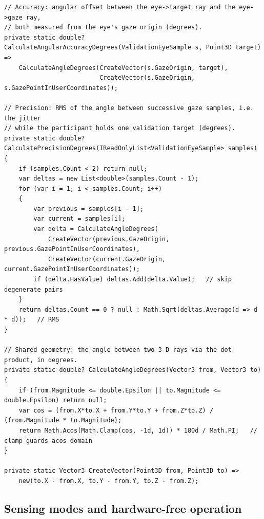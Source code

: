 \begin{listing}[htbp]
\begin{verbatim}
// Accuracy: angular offset between the eye->target ray and the eye->gaze ray,
// both measured from the eye's gaze origin (degrees).
private static double? CalculateAngularAccuracyDegrees(ValidationEyeSample s, Point3D target) =>
    CalculateAngleDegrees(CreateVector(s.GazeOrigin, target),
                          CreateVector(s.GazeOrigin, s.GazePointInUserCoordinates));

// Precision: RMS of the angle between successive gaze samples, i.e. the jitter
// while the participant holds one validation target (degrees).
private static double? CalculatePrecisionDegrees(IReadOnlyList<ValidationEyeSample> samples)
{
    if (samples.Count < 2) return null;
    var deltas = new List<double>(samples.Count - 1);
    for (var i = 1; i < samples.Count; i++)
    {
        var previous = samples[i - 1];
        var current = samples[i];
        var delta = CalculateAngleDegrees(
            CreateVector(previous.GazeOrigin, previous.GazePointInUserCoordinates),
            CreateVector(current.GazeOrigin, current.GazePointInUserCoordinates));
        if (delta.HasValue) deltas.Add(delta.Value);   // skip degenerate pairs
    }
    return deltas.Count == 0 ? null : Math.Sqrt(deltas.Average(d => d * d));   // RMS
}

// Shared geometry: the angle between two 3-D rays via the dot product, in degrees.
private static double? CalculateAngleDegrees(Vector3 from, Vector3 to)
{
    if (from.Magnitude <= double.Epsilon || to.Magnitude <= double.Epsilon) return null;
    var cos = (from.X*to.X + from.Y*to.Y + from.Z*to.Z) / (from.Magnitude * to.Magnitude);
    return Math.Acos(Math.Clamp(cos, -1d, 1d)) * 180d / Math.PI;   // clamp guards acos domain
}

private static Vector3 CreateVector(Point3D from, Point3D to) =>
    new(to.X - from.X, to.Y - from.Y, to.Z - from.Z);
\end{verbatim}
\caption{Calibration accuracy and precision (abbreviated from \texttt{TobiiEyeTracker\-Adapter.cs}): accuracy as angular offset to the target ray, precision as RMS of consecutive sample angles; computed in the adapter to keep eye-tracker geometry off the core.}
\label{lst:impl-validation}
\end{listing}

\FloatBarrier
\subsection{Sensing modes and hardware-free operation}
\label{sec:impl-sensing-modes}

